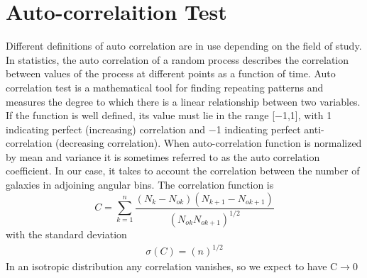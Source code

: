 \section{Auto-correlaition Test}\label{auto}
Different definitions of auto correlation are in use depending on
the field of study. In statistics, the auto correlation of a
random process describes the correlation between values of the
process at different points as a function of time. Auto
correlation test is a mathematical tool for finding repeating
patterns and measures the degree to which there is a linear
relationship between two variables. If the function is well
defined, its value must lie in the range [$-$1,1], with 1
indicating perfect (increasing) correlation and $-$1 indicating
perfect anti-correlation (decreasing correlation). When
auto-correlation function is normalized by mean and variance it is
sometimes referred to as the auto correlation coefficient. In our
case, it takes to account the correlation between the number of
galaxies in adjoining angular bins. The correlation function is
 \begin{equation}
C = \sum_{k=1}^n \frac{(N_{k} -
N_{ok})(N_{k+1}-N_{ok+1})}{(N_{ok}N_{ok+1})^{1/2}}
\end{equation}
with the standard deviation
\begin{equation}
\begin{array}{l}
\sigma(C) =  (n)^{1/2}
\end{array}
\end{equation}
In an isotropic distribution any correlation vanishes, so we
expect to have C$\rightarrow$0\\\\

